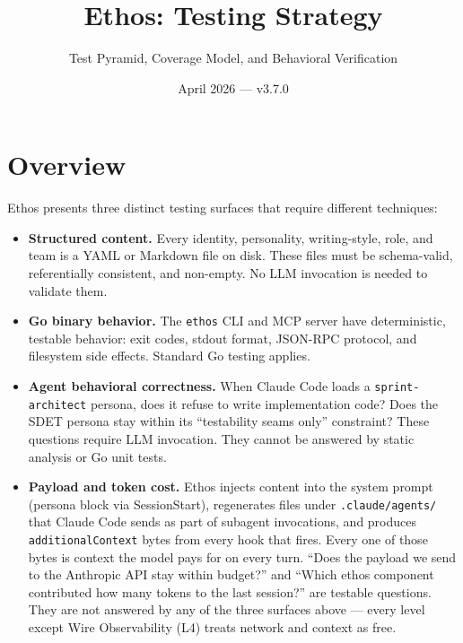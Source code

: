 \documentclass[a4paper,10pt]{article}
\newcommand{\tool}[1]{\texttt{#1}}
\newcommand{\field}[1]{\texttt{#1}}
\newcommand{\fpath}[1]{\texttt{#1}}
\begin{document}
\title{Ethos: Testing Strategy}
\author{Test Pyramid, Coverage Model, and Behavioral Verification}
\date{April 2026 --- v3.7.0}
\maketitle

\tableofcontents
\newpage

\section{Overview}

Ethos presents three distinct testing surfaces that require different
techniques:

\begin{itemize}
  \item \textbf{Structured content.} Every identity, personality,
    writing-style, role, and team is a YAML or Markdown file on disk.
    These files must be schema-valid, referentially consistent, and
    non-empty.  No LLM invocation is needed to validate them.

  \item \textbf{Go binary behavior.} The \tool{ethos} CLI and MCP
    server have deterministic, testable behavior: exit codes, stdout
    format, JSON-RPC protocol, and filesystem side effects.  Standard
    Go testing applies.

  \item \textbf{Agent behavioral correctness.} When Claude Code loads
    a \tool{sprint-architect} persona, does it refuse to write
    implementation code?  Does the SDET persona stay within its
    ``testability seams only'' constraint?  These questions require
    LLM invocation.  They cannot be answered by static analysis or Go
    unit tests.

  \item \textbf{Payload and token cost.} Ethos injects content into
    the system prompt (persona block via SessionStart), regenerates
    files under \fpath{.claude/agents/} that Claude Code sends as part
    of subagent invocations, and produces
    \field{additionalContext} bytes from every hook that fires.
    Every one of those bytes is context the model pays for on every
    turn.  ``Does the payload we send to the Anthropic API stay
    within budget?'' and ``Which ethos component contributed how many
    tokens to the last session?'' are testable questions.  They are
    not answered by any of the three surfaces above --- every level
    except Wire Observability (L4) treats network and context as
    free.
\end{itemize}
\end{document}
